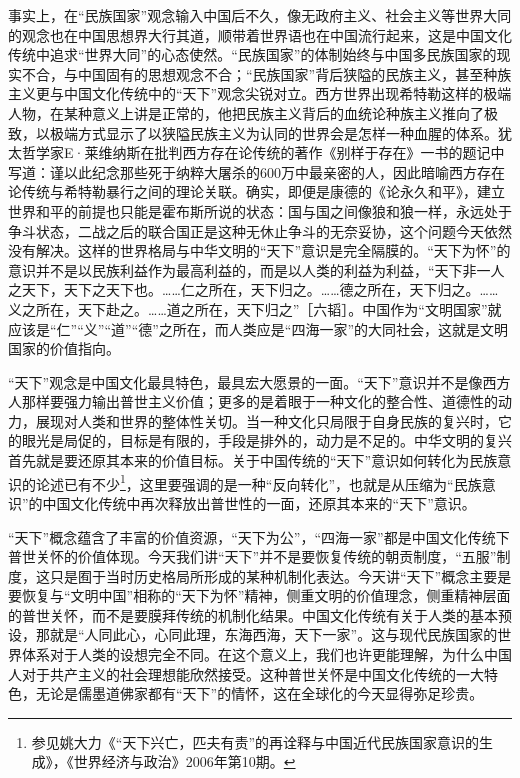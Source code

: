 \documentclass[UTF8, 12pt, a4paper]{ctexrep}
\begin{document}
事实上，在“民族国家”观念输入中国后不久，像无政府主义、社会主义等世界大同的观念也在中国思想界大行其道，顺带着世界语也在中国流行起来，这是中国文化传统中追求“世界大同”的心态使然。“民族国家”的体制始终与中国多民族国家的现实不合，与中国固有的思想观念不合；“民族国家”背后狭隘的民族主义，甚至种族主义更与中国文化传统中的“天下”观念尖锐对立。西方世界出现希特勒这样的极端人物，在某种意义上讲是正常的，他把民族主义背后的血统论种族主义推向了极致，以极端方式显示了以狭隘民族主义为认同的世界会是怎样一种血腥的体系。犹太哲学家E·莱维纳斯在批判西方存在论传统的著作《别样于存在》一书的题记中写道：谨以此纪念那些死于纳粹大屠杀的600万中最亲密的人，因此暗喻西方存在论传统与希特勒暴行之间的理论关联。确实，即便是康德的《论永久和平》，建立世界和平的前提也只能是霍布斯所说的状态：国与国之间像狼和狼一样，永远处于争斗状态，二战之后的联合国正是这种无休止争斗的无奈妥协，这个问题今天依然没有解决。这样的世界格局与中华文明的“天下”意识是完全隔膜的。“天下为怀”的意识并不是以民族利益作为最高利益的，而是以人类的利益为利益，“天下非一人之天下，天下之天下也。……仁之所在，天下归之。……德之所在，天下归之。……义之所在，天下赴之。……道之所在，天下归之”［六韬］。中国作为“文明国家”就应该是“仁”“义”“道”“德”之所在，而人类应是“四海一家”的大同社会，这就是文明国家的价值指向。

“天下”观念是中国文化最具特色，最具宏大愿景的一面。“天下”意识并不是像西方人那样要强力输出普世主义价值；更多的是着眼于一种文化的整合性、道德性的动力，展现对人类和世界的整体性关切。当一种文化只局限于自身民族的复兴时，它的眼光是局促的，目标是有限的，手段是排外的，动力是不足的。中华文明的复兴首先就是要还原其本来的价值目标。关于中国传统的“天下”意识如何转化为民族意识的论述已有不少\footnote{参见姚大力《“天下兴亡，匹夫有责”的再诠释与中国近代民族国家意识的生成》，《世界经济与政治》2006年第10期。}，这里要强调的是一种“反向转化”，也就是从压缩为“民族意识”的中国文化传统中再次释放出普世性的一面，还原其本来的“天下”意识。

“天下”概念蕴含了丰富的价值资源，“天下为公”，“四海一家”都是中国文化传统下普世关怀的价值体现。今天我们讲“天下”并不是要恢复传统的朝贡制度，“五服”制度，这只是囿于当时历史格局所形成的某种机制化表达。今天讲“天下”概念主要是要恢复与“文明中国”相称的“天下为怀”精神，侧重文明的价值理念，侧重精神层面的普世关怀，而不是要膜拜传统的机制化结果。中国文化传统有关于人类的基本预设，那就是“人同此心，心同此理，东海西海，天下一家”。这与现代民族国家的世界体系对于人类的设想完全不同。在这个意义上，我们也许更能理解，为什么中国人对于共产主义的社会理想能欣然接受。这种普世关怀是中国文化传统的一大特色，无论是儒墨道佛家都有“天下”的情怀，这在全球化的今天显得弥足珍贵。
\end{document}
